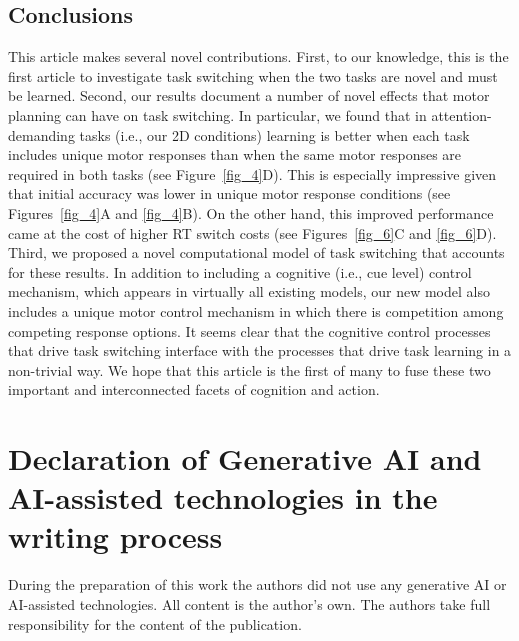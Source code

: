 \documentclass[doc, floatsintext]{apa7}
\begin{document}
\subsection{Conclusions}
This article makes several novel contributions. First, to
our knowledge, this is the first article to investigate task
switching when the two tasks are novel and must be learned.
Second, our results document a number of novel effects that
motor planning can have on task switching. In particular, we
found that in attention-demanding tasks (i.e., our 2D
conditions) learning is better when each task includes
unique motor responses than when the same motor responses
are required in both tasks (see Figure~\ref{fig_4}D). This
is especially impressive given that initial accuracy was
lower in unique motor response conditions (see
Figures~\ref{fig_4}A and \ref{fig_4}B). On the other hand,
this improved performance came at the cost of higher RT
switch costs (see Figures~\ref{fig_6}C and \ref{fig_6}D).
Third, we proposed a novel computational model of task
switching that accounts for these results. In addition to
including a cognitive (i.e., cue level) control mechanism,
which appears in virtually all existing models, our new
model also includes a unique motor control mechanism in
which there is competition among competing response options.
It seems clear that the cognitive control processes that
drive task switching interface with the processes that drive
task learning in a non-trivial way. We hope that this
article is the first of many to fuse these two important and
interconnected facets of cognition and action.

% 
\section{Declaration of Generative AI and AI-assisted
technologies in the writing process}

During the preparation of this work the authors did not use
any generative AI or AI-assisted technologies.  All content
is the author's own.  The authors take full responsibility
for the content of the publication.
\end{document}
